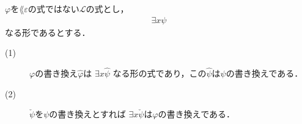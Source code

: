	\begin{screen}
		\begin{metathm}[部分式の書き換えとの関係3]
		\label{metathm:relation_to_subformula_rewriting_1}
			$\varphi$を$\lang{\varepsilon}$の式ではない$\mathcal{L}$の式とし，
			\begin{align}
				\exists x \psi
			\end{align}
			なる形であるとする．
			\begin{description}
				\item[(1)] $\varphi$の書き換え$\widehat{\varphi}$は
					$\exists x \widehat{\psi}$
					なる形の式であり，この$\widehat{\psi}$は$\psi$の書き換えである．
			
				\item[(2)] $\check{\psi}$を$\psi$の書き換えとすれば
					$\exists x \check{\psi}$は$\varphi$の書き換えである．
			\end{description}
		\end{metathm}
	\end{screen}
	
